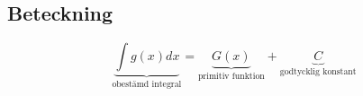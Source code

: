 \subsection{Beteckning} %
\label{sub:beteckning}
\[
\underbrace{\int g(x) dx}_\text{obestämd integral} = \underbrace{G(x)}_\text{primitiv funktion} + \underbrace{C}_\text{godtycklig konstant}
\]

























